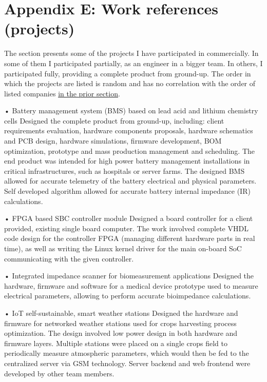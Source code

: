 \documentclass{tccv}
\begin{document}
\clearpage

\section{Appendix E: Work references (projects)}

The section presents some of the projects I have participated in commercially. In some of them I participated partially, as an engineer in a bigger team. In others, I participated fully, providing a complete product from ground-up. The order in which the projects are listed is random and has no correlation with the order of listed companies  \hyperref[sec:clients]{in the prior section}. \\

\begin{yearlist}

\item[Full product bringup]{•}
     {Battery management system (BMS) based on lead acid and lithium chemistry cells}
     {Designed the complete product from ground-up, including: client requirements evaluation, hardware components proposals, hardware schematics and PCB design, hardware simulations, firmware development, BOM optimization, prototype and mass production management and scheduling. The end product was intended for high power battery management installations in critical infrastructures, such as hospitals or server farms. The designed BMS allowed for accurate telemetry of the battery electrical and physical parameters. Self developed algorithm allowed for accurate battery internal impedance (IR) calculations.}
     
\item[Hardware description and kernel drivers development]{•}
     {FPGA based SBC controller module}
     {Designed a board controller for a client provided, existing single board computer. The work involved complete VHDL code design for the controller FPGA (managing different hardware parts in real time), as well as writing the Linux kernel driver for the main on-board SoC communicating with the given controller.}
     
\item[Full product bringup]{•}
     {Integrated impedance scanner for biomeasurement applications}
     {Designed the hardware, firmware and software for a medical device prototype used to measure electrical parameters, allowing to perform accurate bioimpedance calculations.}
     
\item[Hardware and firmware development]{•}
     {IoT self-sustainable, smart weather stations}
     {Designed the hardware and firmware for networked weather stations used for crops harvesting process optimization. The design involved low power design in both hardware and firmware layers. Multiple stations were placed on a single crops field to periodically measure atmospheric parameters, which would then be fed to the centralized server via GSM technology. Server backend and web frontend were developed by other team members.}
     

\end{yearlist}
\end{document}
